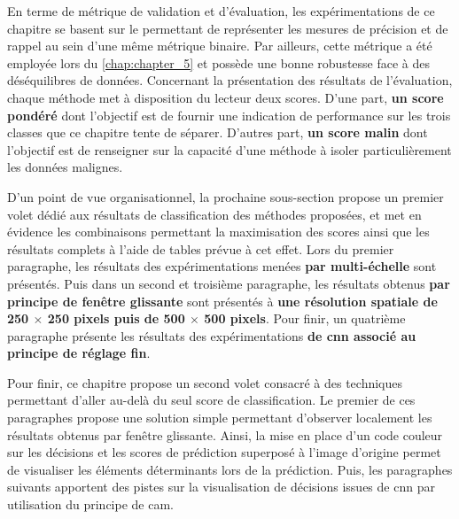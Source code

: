 En terme de métrique de validation et d'évaluation, les expérimentations de ce chapitre se basent sur le \textbf{\fscore{}} permettant de représenter les mesures de précision et de rappel au sein d'une même métrique binaire. Par ailleurs, cette métrique a été employée lors du \cref{chap:chapter_5} et possède une bonne robustesse face à des déséquilibres de données. Concernant la présentation des résultats de l'évaluation, chaque méthode met à disposition du lecteur deux scores. D'une part, \textbf{un score pondéré} dont l'objectif est de fournir une indication de performance sur les trois classes que ce chapitre tente de séparer. D'autres part, \textbf{un score malin} dont l'objectif est de renseigner sur la capacité d'une méthode à isoler particulièrement les données malignes.\par

D'un point de vue organisationnel, la prochaine sous-section propose un premier volet dédié aux résultats de classification des méthodes proposées, et met en évidence les combinaisons permettant la maximisation des scores ainsi que les résultats complets à l'aide de tables prévue à cet effet. Lors du premier paragraphe, les résultats des expérimentations menées \textbf{par multi-échelle} sont présentés. Puis dans un second et troisième paragraphe, les résultats obtenus \textbf{par principe de fenêtre glissante} sont présentés à \textbf{une résolution spatiale de 250 $\times$ 250 pixels puis de 500 $\times$ 500 pixels}. Pour finir, un quatrième paragraphe présente les résultats des expérimentations \textbf{de \gls{cnn} associé au principe de réglage fin}.\par

Pour finir, ce chapitre propose un second volet consacré à des techniques permettant d'aller au-delà du seul score de classification. Le premier de ces paragraphes propose une solution simple permettant d'observer localement les résultats obtenus par fenêtre glissante. Ainsi, la mise en place d'un code couleur sur les décisions et les scores de prédiction superposé à l'image d'origine permet de visualiser les éléments déterminants lors de la prédiction. Puis, les paragraphes suivants apportent des pistes sur la visualisation de décisions issues de \gls{cnn} par utilisation du principe de \gls{cam}.\par
\clearpage

